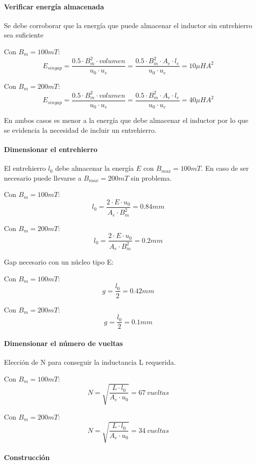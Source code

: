 \paragraph{Verificar energía almacenada}

Se debe corroborar que la energía que puede almacenar el inductor sin entrehierro sea suficiente

Con $B_m=100mT$:
$$ E_{singap}=\frac{0.5\cdot B_m^2\cdot {volumen}}{u_0\cdot u_e}=\frac{0.5\cdot B_m^2\cdot A_e\cdot l_e}{u_0\cdot u_e}=10\mu HA^2 $$

Con $B_m=200mT$:
$$ E_{singap}=\frac{0.5\cdot B_m^2\cdot {volumen}}{u_0\cdot u_e}=\frac{0.5\cdot B_m^2\cdot A_e\cdot l_e}{u_0\cdot u_e}=40\mu HA^2 $$

En ambos casos es menor a la energía que debe almacenar el inductor por lo que se evidencia la necesidad de incluir un entrehierro. 

\paragraph{Dimensionar el entrehierro}

El entrehierro $l_0$ debe almacenar la energía $E$ con $B_{max}=100mT$.
En caso de ser necesario puede llevarse a $B_{max}=200mT$ sin problema. 

Con $B_m=100mT$:
$$ l_0=\frac{2\cdot E\cdot u_0}{A_e\cdot B_m^2}=0.84mm $$

Con $B_m=200mT$:
$$ l_0=\frac{2\cdot E\cdot u_0}{A_e\cdot B_m^2}=0.2mm $$

Gap necesario con un núcleo tipo E:

Con $B_m=100mT$:
$$ g=\frac{l_0}{2}=0.42mm $$

Con $B_m=200mT$:
$$ g=\frac{l_0}{2}=0.1mm $$

\paragraph{Dimensionar el número de vueltas}

Elección de N para conseguir la inductancia L requerida.

Con $B_m=100mT$:
$$ N=\sqrt{\frac{L\cdot l_0}{A_e\cdot u_0}}=67\ vueltas$$

Con $B_m=200mT$:
$$ N=\sqrt{\frac{L\cdot l_0}{A_e\cdot u_0}}=34\ vueltas $$

\paragraph{Construcción}


